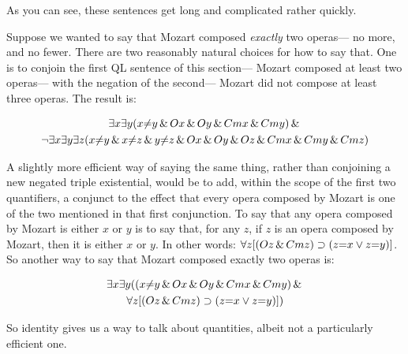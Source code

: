 As you can see, these sentences get long and complicated rather quickly.

Suppose we wanted to say that Mozart composed \emph{exactly} two operas--- no more, and no fewer. There are two reasonably natural choices for how to say that. One is to conjoin the first QL sentence of this section--- Mozart composed at least two operas--- with the negation of the second--- Mozart did not compose at least three operas. The result is:

\begin{multline*}
\exists x \exists y (x {\neq} y \,\&\, Ox \,\&\, Oy \,\&\, Cmx \,\&\, Cmy) \,\&\, \\ \neg \exists x \exists y \exists z (x {\neq} y \,\&\, x {\neq} z \,\&\, y {\neq} z \,\&\, Ox \,\&\, Oy \,\&\, Oz \,\&\, Cmx \,\&\, Cmy \,\&\, Cmz)
\end{multline*}

A slightly more efficient way of saying the same thing, rather than conjoining a new negated triple existential, would be to add, within the scope of the first two quantifiers, a conjunct to the effect that every opera composed by Mozart is one of the two mentioned in that first conjunction. To say that any opera composed by Mozart is either $x$ or $y$ is to say that, for any $z$, if $z$ is an opera composed by Mozart, then it is either $x$ or $y$. In other words: $\forall z [(Oz \,\&\, Cmz) \supset (z{=}x \vee z{=}y)]$. So another way to say that Mozart composed exactly two operas is:

\begin{multline*}
\exists x \exists y ((x {\neq} y  \,\&\,  Ox \,\&\, Oy \,\&\,  Cmx \,\&\, Cmy) \,\&\, \\
\forall z [(Oz \,\&\, Cmz) \supset (z{=}x \vee z{=}y)])
\end{multline*}

So identity gives us a way to talk about quantities, albeit not a particularly efficient one.



